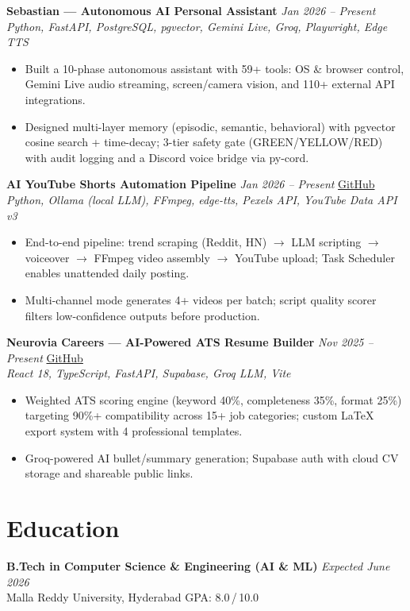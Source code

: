\documentclass[9.5pt]{article}
\begin{document}
\vspace{1.5pt}
\textbf{Sebastian --- Autonomous AI Personal Assistant} \hfill \textit{Jan 2026 -- Present}\\
\textit{Python, FastAPI, PostgreSQL, pgvector, Gemini Live, Groq, Playwright, Edge TTS}
\begin{itemize}
  \item Built a 10-phase autonomous assistant with 59+ tools: OS \& browser control, Gemini Live audio streaming, screen/camera vision, and 110+ external API integrations.
  \item Designed multi-layer memory (episodic, semantic, behavioral) with pgvector cosine search + time-decay; 3-tier safety gate (GREEN/YELLOW/RED) with audit logging and a Discord voice bridge via py-cord.
\end{itemize}

\vspace{1.5pt}
\textbf{AI YouTube Shorts Automation Pipeline} \hfill \textit{Jan 2026 -- Present} \quad \href{https://github.com/JeetInTech/Youtube-shorts-Automation}{GitHub}\\
\textit{Python, Ollama (local LLM), FFmpeg, edge-tts, Pexels API, YouTube Data API v3}
\begin{itemize}
  \item End-to-end pipeline: trend scraping (Reddit, HN) $\rightarrow$ LLM scripting $\rightarrow$ voiceover $\rightarrow$ FFmpeg video assembly $\rightarrow$ YouTube upload; Task Scheduler enables unattended daily posting.
  \item Multi-channel mode generates 4+ videos per batch; script quality scorer filters low-confidence outputs before production.
\end{itemize}

\vspace{1.5pt}
\textbf{Neurovia Careers --- AI-Powered ATS Resume Builder} \hfill \textit{Nov 2025 -- Present} \quad \href{https://github.com/JeetInTech/CvForge-Online}{GitHub}\\
\textit{React 18, TypeScript, FastAPI, Supabase, Groq LLM, Vite}
\begin{itemize}
  \item Weighted ATS scoring engine (keyword 40\%, completeness 35\%, format 25\%) targeting 90\%+ compatibility across 15+ job categories; custom LaTeX export system with 4 professional templates.
  \item Groq-powered AI bullet/summary generation; Supabase auth with cloud CV storage and shareable public links.
\end{itemize}

\section*{Education}
\textbf{B.Tech in Computer Science \& Engineering (AI \& ML)} \hfill \textit{Expected June 2026}\\
Malla Reddy University, Hyderabad \hfill GPA: 8.0\,/\,10.0
\end{document}
